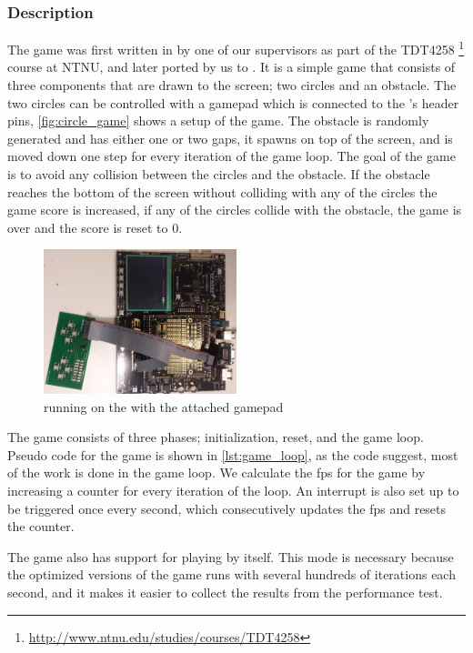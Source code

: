\subsubsection{Description}

The game was first written in {\C} by one of our supervisors as part of the TDT4258 \footnote{\url{http://www.ntnu.edu/studies/courses/TDT4258}} course at NTNU, and later ported by us to {\rust}.
It is a simple game that consists of three components that are drawn to the screen; two circles and an obstacle.
The two circles can be controlled with a gamepad which is connected to the {\DK}'s header pins, \autoref{fig:circle_game} shows a setup of the game.
The obstacle is randomly generated and has either one or two gaps, it spawns on top of the screen, and is moved down one step for every iteration of the game loop.
The goal of the game is to avoid any collision between the circles and the obstacle.
If the obstacle reaches the bottom of the screen without colliding with any of the circles the game score is increased, if any of the circles collide with the obstacle, the game is over and the score is reset to 0.

\begin{figure}[H]
  \centering
  \includegraphics[width=0.5\textwidth]{figures/circle-game.jpg}
  \caption{{\cg} running on the {\DK} with the attached gamepad}
  \label{fig:circle_game}
\end{figure}

The game consists of three phases; initialization, reset, and the game loop.
Pseudo code for the game is shown in \autoref{lst:game_loop}, as the code suggest, most of the work is done in the game loop.
We calculate the \gls{fps} for the game by increasing a counter for every iteration of the loop.
An interrupt is also set up to be triggered once every second, which consecutively updates the \gls{fps} and resets the counter.

The game also has support for playing by itself.
This mode is necessary because the optimized versions of the game runs with several hundreds of iterations each second, and it makes it easier to collect the results from the performance test.


